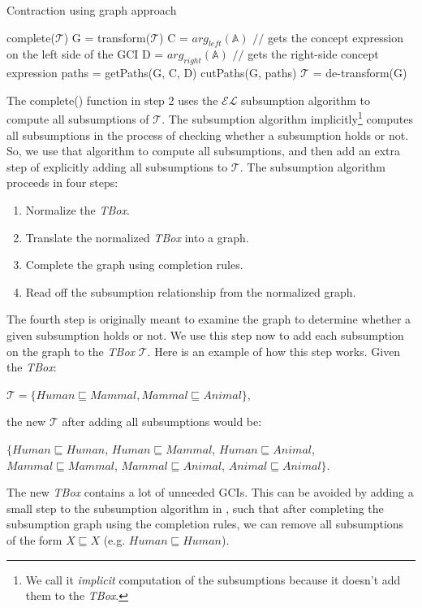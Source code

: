 \begin{algorithm}
\caption{Contraction using graph approach}
\label{GraphContract}
\begin{algorithmic}[1]
\State complete($ \mathcal{T} $)
\State G = transform($ \mathcal{T} $)
\State C = $arg_{left}(\mathbb{A})$ $//$ gets the concept expression on the left side of the GCI
\State D = $arg_{right}(\mathbb{A})$ $//$ gets the right-side concept expression
\State paths = getPaths(G, C, D)
\State cutPaths(G, paths)
\State $ \mathcal{T} $ = de-transform(G)
\EndFunction
\end{algorithmic}
\end{algorithm}

The complete() function in step 2 uses the $\mathcal{EL}$ subsumption algorithm to compute all subsumptions of $\mathcal{T}$. The subsumption algorithm implicitly\footnote{We call it \textit{implicit} computation of the subsumptions because it doesn't add them to the \textit{TBox}.} computes all subsumptions in the process of checking whether a subsumption holds or not. So, we use that algorithm to compute all subsumptions, and then add an extra step of explicitly adding all subsumptions to $\mathcal{T}$. The subsumption algorithm proceeds in four steps:\cite{new}
\begin{enumerate}
\item Normalize the \textit{TBox}.
\item Translate the normalized \textit{TBox} into a graph.
\item Complete the graph using completion rules.
\item Read off the subsumption relationship from the normalized graph.
\end{enumerate}
The fourth step is originally meant to examine the graph to determine whether a given subsumption holds or not. We use this step now to add each subsumption on the graph to the \textit{TBox} $\mathcal{T}$. Here is an example of how this step works. Given the \textit{TBox}:
\begin{center} 
$\mathcal{T} = \{Human \sqsubseteq Mammal, Mammal \sqsubseteq Animal\}$, 
\end{center}
the new $\mathcal{T}$ after adding all subsumptions would be: 
\begin{center}
$\{Human \sqsubseteq Human$, $Human \sqsubseteq Mammal$, $Human \sqsubseteq Animal$, $Mammal \sqsubseteq Mammal$, $Mammal \sqsubseteq Animal$, $Animal \sqsubseteq Animal\}$. 
\end{center}
The new \textit{TBox} contains a lot of unneeded GCIs. This can be avoided by adding a small step to the subsumption algorithm in \cite{small}, such that after completing the subsumption graph using the completion rules, we can remove all subsumptions of the form $X \sqsubseteq X$ (e.g. $Human \sqsubseteq Human$).

